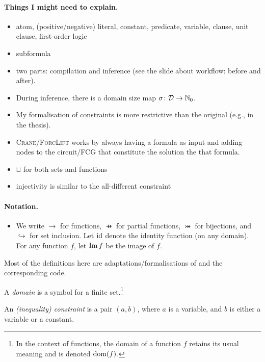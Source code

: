 \paragraph{Things I might need to explain.}
\begin{itemize}
  \item atom, (positive/negative) literal, constant, predicate, variable,
        clause, unit clause, first-order logic
  \item subformula
  \item two parts: compilation and inference (see the slide about workflow:
        before and after).
  \item During inference, there is a domain size map
        $\operatorname{\sigma}\colon \mathcal{D} \to \mathbb{N}_0$.
  \item My formalisation of constraints is more restrictive than the original
        (e.g., in the thesis).
  \item \textsc{Crane/ForcLift} works by always having a formula as input and
        adding nodes to the circuit/FCG that constitute the solution the that
        formula.
  \item $\sqcup$ for both sets and functions
  \item injectivity is similar to the all-different constraint
\end{itemize}

\paragraph{Notation.}
\begin{itemize}
\item We write $\to$ for functions, $\pfun$ for partial functions, $\twoheadrightarrowtail$ for bijections, and $\hookrightarrow$ for set inclusion. Let $\operatorname{id}$ denote the identity function (on any domain). For any function $f$, let $\operatorname{Im} f$ be the image of $f$.
\end{itemize}

Most of the definitions here are adaptations/formalisations of \citep{DBLP:conf/ijcai/BroeckTMDR11} and the corresponding code.

\begin{definition}
  A \emph{domain} is a symbol for a finite set.\footnote{In the context of functions, the domain of a function $f$ retains its usual meaning and is denoted $\operatorname{dom}(f)$.}
\end{definition}

\begin{definition}
  An \emph{(inequality) constraint} is a pair $(a, b)$, where $a$ is a variable, and $b$ is either a variable or a constant.
\end{definition}

